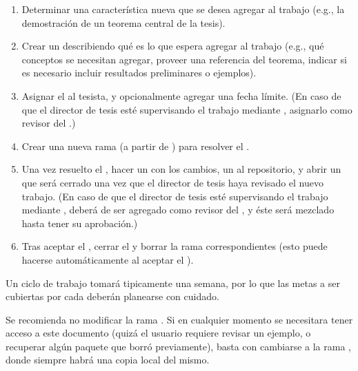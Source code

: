 \begin{enumerate}
  \item Determinar una caracter\'istica nueva que se desea agregar al
    trabajo (e.g., la demostraci\'on de un teorema central de la tesis).

  \item Crear un  describiendo qu\'e es lo que espera agregar
    al trabajo (e.g., qu\'e conceptos se necesitan agregar, proveer una
    referencia del teorema, indicar si es necesario incluir resultados
    preliminares o ejemplos).

  \item Asignar el  al tesista, y opcionalmente agregar una fecha
    l\'imite.   (En caso de que el director de tesis est\'e supervisando el
    trabajo mediante , asignarlo como revisor del .)

  \item Crear una nueva rama (a partir de ) para resolver el
    .

  \item Una vez resuelto el , hacer un  con los cambios,
    un  al repositorio, y abrir un  que ser\'a
    cerrado una vez que el director de tesis haya revisado el nuevo trabajo.
    (En caso de que el director de tesis est\'e supervisando el trabajo mediante
    , deber\'a de ser agregado como revisor del ,
    y \'este ser\'a mezclado hasta tener su aprobaci\'on.)

  \item Tras aceptar el , cerrar el  y borrar la
    rama correspondientes (esto puede hacerse autom\'aticamente al aceptar el
    ).
\end{enumerate}

Un ciclo de trabajo tomar\'a tipicamente una semana, por lo que las metas a ser
cubiertas por cada  deber\'an planearse con cuidado.

Se recomienda no modificar la rama .   Si en cualquier momento se
necesitara tener acceso a este documento (quiz\'a el usuario requiere revisar un
ejemplo, o recuperar alg\'un paquete que borr\'o previamente), basta con
cambiarse a la rama , donde siempre habr\'a una copia local del
mismo.

